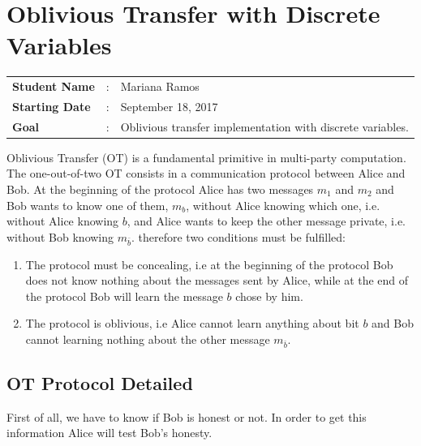 \clearpage
\section{Oblivious Transfer with Discrete Variables}

\begin{tcolorbox}	
\begin{tabular}{p{2.75cm} p{0.2cm} p{10.5cm}} 	
\textbf{Student Name}  &:& Mariana Ramos\\
\textbf{Starting Date} &:& September 18, 2017\\
\textbf{Goal}          &:& Oblivious transfer implementation with discrete variables.
\end{tabular}
\end{tcolorbox}

Oblivious Transfer (OT) is a fundamental primitive in multi-party computation. The one-out-of-two OT consists in a communication protocol between Alice and Bob. At the beginning of the protocol Alice has two messages $m_1$ and $m_2$ and Bob wants to know one of them, $m_b$, without Alice knowing which one, i.e. without Alice knowing $b$, and Alice wants to keep the other message private, i.e. without Bob knowing $m_{\bar{b}}$. therefore two conditions must be fulfilled:
\begin{enumerate}
	\item{The protocol must be concealing, i.e at the beginning of the protocol Bob does not know nothing about the messages sent by Alice, while at the end of the protocol Bob will learn the message $b$ chose by him.}
	\item{The protocol is oblivious, i.e Alice cannot learn anything about bit $b$ and Bob cannot learning nothing about the other message $m_{\bar{b}}$.}
\end {enumerate}

\subsection{OT Protocol Detailed}


First of all, we have to know if Bob is honest or not. In order to get this information Alice will test Bob's honesty.

